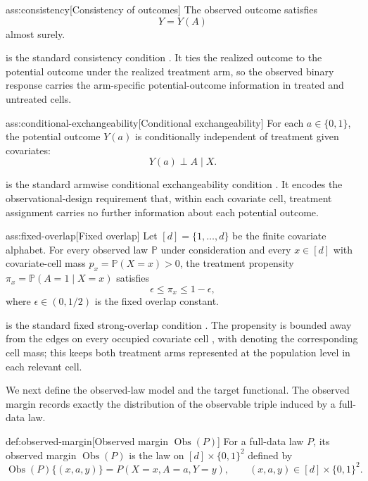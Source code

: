 \begin{assumptionv}{ass:consistency}[Consistency of outcomes]
The observed outcome satisfies
\[
Y=Y(A)
\]
almost surely.
\end{assumptionv}

 is the standard consistency condition \citep{ZengBalakrishnanHanKennedy2024Discrete}. It ties the realized outcome to the potential outcome under the realized treatment arm, so the observed binary response carries the arm-specific potential-outcome information in treated and untreated cells.

\begin{assumptionv}{ass:conditional-exchangeability}[Conditional exchangeability]
For each \(a\in\{0,1\}\), the potential outcome \(Y(a)\) is conditionally independent of treatment given covariates:
\[
Y(a)\perp A\mid X .
\]
\end{assumptionv}

 is the standard armwise conditional exchangeability condition \citep{ZengBalakrishnanHanKennedy2024Discrete}. It encodes the observational-design requirement that, within each covariate cell, treatment assignment carries no further information about each potential outcome.

\begin{assumptionv}{ass:fixed-overlap}[Fixed overlap]
Let \([d]=\{1,\ldots,d\}\) be the finite covariate alphabet. For every observed law \(\mathbb P\) under consideration and every \(x\in[d]\) with covariate-cell mass \(p_x=\mathbb P(X=x)>0\), the treatment propensity \(\pi_x=\mathbb P(A=1\mid X=x)\) satisfies
\[
\epsilon\leq \pi_x \leq 1-\epsilon ,
\]
where \(\epsilon\in(0,1/2)\) is the fixed overlap constant.
\end{assumptionv}

 is the standard fixed strong-overlap condition \citep{ZengBalakrishnanHanKennedy2024Discrete}. The propensity  is bounded away from the edges on every occupied covariate cell , with  denoting the corresponding cell mass; this keeps both treatment arms represented at the population level in each relevant cell.

We next define the observed-law model and the target functional. The observed margin records exactly the distribution of the observable triple induced by a full-data law.

\begin{definitionv}{def:observed-margin}[Observed margin \(\operatorname{Obs}(P)\)]
For a full-data law \(P\), its observed margin \(\operatorname{Obs}(P)\) is the law on \([d]\times\{0,1\}^2\) defined by
\[
\operatorname{Obs}(P)\{(x,a,y)\}
=
P(X=x,A=a,Y=y),
\qquad
(x,a,y)\in[d]\times\{0,1\}^2.
\]
\end{definitionv}

